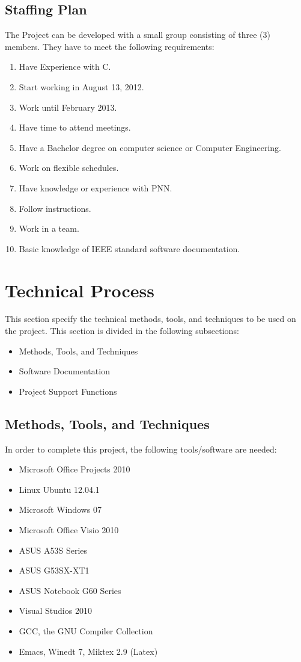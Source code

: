 \documentclass[12pt]{article}
\begin{document}
\subsection{Staffing Plan}
The Project can be developed with a small group consisting of three (3) members. They have to meet the following requirements:
\begin{enumerate}
  \item Have Experience with C.
  \item Start working in August 13, 2012.
  \item Work until February 2013.
  \item Have time to attend meetings.
  \item Have a Bachelor degree on computer science or Computer Engineering.
  \item Work on flexible schedules.
  \item Have knowledge or experience with PNN.
  \item Follow instructions.
  \item Work in a team.
  \item Basic knowledge of IEEE standard software documentation.
\end{enumerate}

\section{Technical Process}
This section specify the technical methods, tools, and techniques to be used on the project. This section is divided in the following subsections:
\begin{itemize}
  \item Methods, Tools, and Techniques
  \item Software Documentation
  \item Project Support Functions
\end{itemize}

\subsection{Methods, Tools, and Techniques}
In order to complete this project, the following tools/software are needed:

\begin{itemize}
  \item Microsoft Office Projects 2010
  \item Linux Ubuntu 12.04.1
  \item Microsoft Windows 07
  \item Microsoft Office Visio 2010
  \item ASUS A53S Series
  \item ASUS G53SX-XT1
  \item ASUS Notebook G60 Series
  \item Visual Studios 2010
  \item GCC, the GNU Compiler Collection
  \item Emacs, Winedt 7, Miktex 2.9 (Latex)
\end{itemize}
\end{document}
